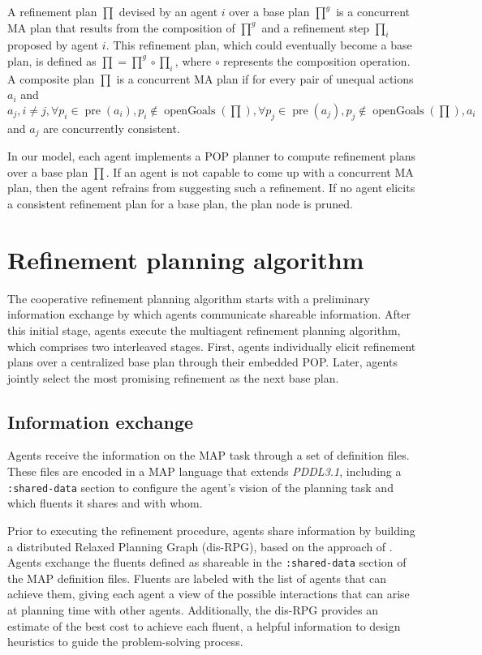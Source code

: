 \documentclass[12pt]{article}
\DeclareMathOperator{\pre}{pre}
\DeclareMathOperator{\openGoals}{openGoals}
\begin{document}
A refinement plan $\prod$ devised by an agent $i$ over a base plan $\prod^g$ is a concurrent MA plan that results from the composition of $\prod^g$ and a refinement step $\prod_i$ proposed by agent $i$.
This refinement plan, which could eventually become a base plan, is defined as $\prod = \prod^g \circ \prod_i$, where $\circ$ represents the composition operation.
A composite plan $\prod$ is a concurrent MA plan if for every pair of unequal actions $a_i$ and $a_j, i \neq j, \forall p_i \in \pre(a_i), p_i \notin \openGoals(\prod), \forall p_j \in \pre(a_j), p_j \notin \openGoals(\prod), a_i$ and $a_j$ are concurrently consistent.

In our model, each agent implements a POP planner to compute refinement plans over a base plan $\prod$.
If an agent is not capable to come up with a concurrent MA plan, then the agent refrains from suggesting such a refinement.
If no agent elicits a consistent refinement plan for a base plan, the plan node is pruned.

\section{Refinement planning algorithm}

The cooperative refinement planning algorithm starts with a preliminary information exchange by which agents communicate shareable information.
After this initial stage, agents execute the multiagent refinement planning algorithm, which comprises two interleaved stages.
First, agents individually elicit refinement plans over a centralized base plan through their embedded POP.
Later, agents jointly select the most promising refinement as the next base plan.

\subsection{Information exchange}

Agents receive the information on the MAP task through a set of definition files.
These files are encoded in a MAP language that extends \textit{PDDL3.1}, including a \texttt{:shared-data} section to configure the agent’s vision of the planning task and which fluents it shares and with whom.

Prior to executing the refinement procedure, agents share information by building a distributed Relaxed Planning Graph (dis-RPG), based on the approach of \cite{Zhang2007GraphbasedMR}.
Agents exchange the fluents defined as shareable in the \texttt{:shared-data} section of the MAP definition files.
Fluents are labeled with the list of agents that can achieve them, giving each agent a view of the possible interactions that can arise at planning time with other agents.
Additionally, the dis-RPG provides an estimate of the best cost to achieve each fluent, a helpful information to design heuristics to guide the problem-solving process.
\end{document}
